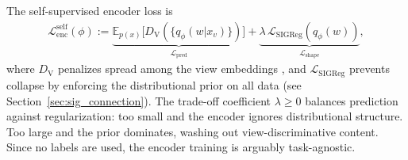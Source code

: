 \documentclass[11pt]{article}
\begin{document}
The self-supervised encoder loss is
\begin{align}
    \mathcal{L}_{\mathrm{enc}}^{\mathrm{self}}(\phi) :=
    \underbrace{\mathbb{E}_{p(x)}\bigl[
        D_{\mathrm{V}}(\{q_\phi(w|x_v)\})
    \bigr]}_{\mathcal{L}_{\mathrm{pred}}}
    + \underbrace{\lambda\,\mathcal{L}_{\mathrm{SIGReg}}(q_\phi(w))}_{\mathcal{L}_{\mathrm{shape}}},
    \label{eq:self_loss}
\end{align}
where $D_{\mathrm{V}}$ penalizes spread among the view embeddings \cite{balestriero2025lejepa}, and $\mathcal{L}_{\mathrm{SIGReg}}$ prevents collapse
by enforcing the distributional prior on all data
(see Section~\ref{sec:sig_connection}).
The trade-off coefficient $\lambda\geq 0$ balances prediction against
regularization: too small and the encoder ignores distributional
structure. Too large and the prior dominates, washing out
view-discriminative content.
Since no labels are used, the encoder training is arguably task-agnostic.




\end{document}
